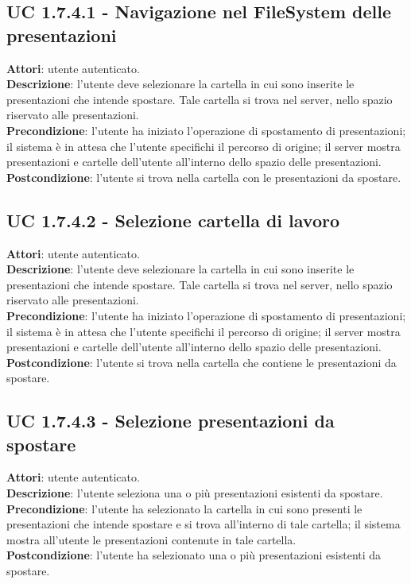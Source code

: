 		\subsection{UC 1.7.4.1 - Navigazione nel FileSystem delle presentazioni}{
			\label{uc1.7.4.1}
			\textbf{Attori}: utente autenticato. \\
			\textbf{Descrizione}: l'utente deve selezionare la cartella in cui sono inserite le presentazioni che intende spostare. Tale cartella si trova nel server, nello spazio riservato alle presentazioni. \\
			\textbf{Precondizione}: l'utente ha iniziato l'operazione di spostamento di presentazioni; il sistema è in attesa che l'utente specifichi il percorso di origine; il server mostra presentazioni e cartelle dell'utente all'interno dello spazio delle presentazioni.	\\
			\textbf{Postcondizione}: l'utente si trova nella cartella con le presentazioni da spostare.	\\
			}
		\subsection{UC 1.7.4.2 - Selezione cartella di lavoro}{
			\label{uc1.7.4.2}
			\textbf{Attori}: utente autenticato. \\
			\textbf{Descrizione}: l'utente deve selezionare la cartella in cui sono inserite le presentazioni che intende spostare. Tale cartella si trova nel server, nello spazio riservato alle presentazioni. \\
			\textbf{Precondizione}: l'utente ha iniziato l'operazione di spostamento di presentazioni; il sistema è in attesa che l'utente specifichi il percorso di origine; il server mostra presentazioni e cartelle dell'utente all'interno dello spazio delle presentazioni.	\\
			\textbf{Postcondizione}: l'utente si trova nella cartella che contiene le presentazioni da spostare.	\\
			}
		\subsection{UC 1.7.4.3 - Selezione presentazioni da spostare}{
			\label{uc1.7.4.3}
			\textbf{Attori}: utente autenticato. \\
			\textbf{Descrizione}: l'utente seleziona una o più presentazioni esistenti da spostare. \\
			\textbf{Precondizione}: l'utente ha selezionato la cartella in cui sono presenti le presentazioni che intende spostare e si trova all'interno di tale cartella; il sistema mostra all'utente le presentazioni contenute in tale cartella.	\\
			\textbf{Postcondizione}: l'utente ha selezionato una o più presentazioni esistenti da spostare.	\\
			}				
